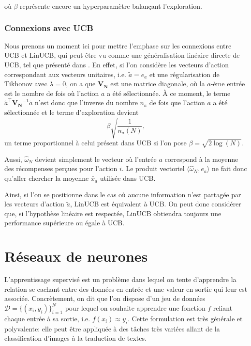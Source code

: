 où $\beta$ représente encore un hyperparamètre balançant l'exploration.

\subsubsection*{Connexions avec UCB}

Nous prenons un moment ici pour mettre l'emphase sur les connexions entre UCB et 
LinUCB, qui peut être vu comme une généralisation linéaire directe de UCB,
tel que présenté dans \citet{banditalgs}. 
En effet, si l'on considère les vecteurs d'action correspondant aux vecteurs unitaires,
i.e. $\tilde{a} = e_a$ et une régularisation de Tikhonov avec $\lambda = 0$, on 
a que $\mathbf{V_N}$ est une matrice diagonale, où la $a$-ème entrée est le nombre 
de fois où l'action $a$ a été sélectionnée.
À ce moment, le terme $\tilde{a}^\top \mathbf{V_N}^{-1} \tilde{a}$ n'est 
donc que l'inverse du nombre $n_a$ de fois que l'action $a$ a été sélectionnée et le 
terme d'exploration devient
\begin{equation*}
\beta\sqrt{\frac{1}{n_a(N)}},
\end{equation*}
un terme proportionnel à celui présent dans UCB si l'on pose $\beta = \sqrt{2\log(N)}$.

Aussi, $\hat{\omega}_N$ devient simplement le vecteur où l'entrée $a$ correspond 
à la moyenne des récompenses perçues pour l'action $i$.
Le produit vectoriel $\langle \hat{\omega}_N, e_a \rangle$ ne fait donc qu'aller
chercher la moyenne $\bar{x}_a$ utilisée dans UCB.

Ainsi, si l'on se positionne dans le cas où aucune information n'est partagée par 
les vecteurs d'action $\tilde{a}$, LinUCB est équivalent à UCB.
On peut donc considérer que, si l'hypothèse linéaire est respectée, LinUCB 
obtiendra toujours une performance supérieure ou égale à UCB.

\section{Réseaux de neurones}

L'apprentissage supervisé est un problème dans lequel on tente 
d'apprendre la relation se cachant entre des données en entrée 
et une valeur en sortie qui leur est associée.
Concrètement, on dit que l'on dispose d'un jeu de données 
$\mathcal{D} = \{(x_i, y_i) \}_{i=1}^N$ pour lequel on souhaite apprendre 
une fonction $f$ reliant chaque entrée à sa sortie, i.e. $f(x_i) \approx y_i$.
Cette formulation est très générale et polyvalente: elle peut être appliquée 
à des tâches très variées allant de la classification d'images 
à la traduction de textes. 

